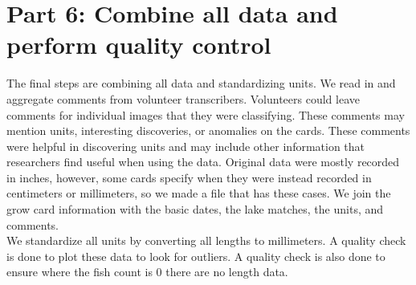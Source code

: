 \documentclass[
]{article}
\begin{document}
\hypertarget{part-6-combine-all-data-and-perform-quality-control}{%
\section{Part 6: Combine all data and perform quality
control}\label{part-6-combine-all-data-and-perform-quality-control}}

The final steps are combining all data and standardizing units. We read
in and aggregate comments from volunteer transcribers. Volunteers could
leave comments for individual images that they were classifying. These
comments may mention units, interesting discoveries, or anomalies on the
cards. These comments were helpful in discovering units and may include
other information that researchers find useful when using the data.
Original data were mostly recorded in inches, however, some cards
specify when they were instead recorded in centimeters or millimeters,
so we made a file that has these cases. We join the grow card
information with the basic dates, the lake matches, the units, and
comments.\\
We standardize all units by converting all lengths to millimeters. A
quality check is done to plot these data to look for outliers. A quality
check is also done to ensure where the fish count is 0 there are no
length data.
\end{document}
